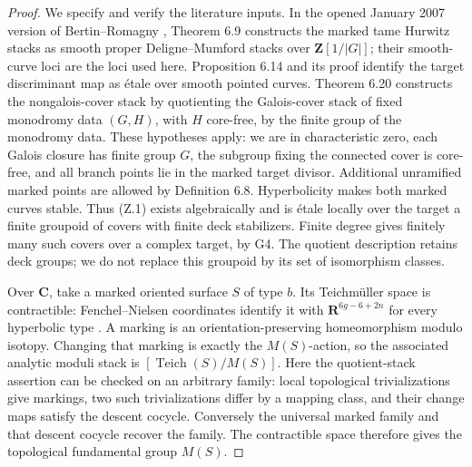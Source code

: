 \begin{proof}
We specify and verify the literature inputs. In the opened January
2007 version of Bertin--Romagny \cite{G_BertinRomagny2007}, Theorem 6.9
constructs the marked tame Hurwitz stacks as smooth proper
Deligne--Mumford stacks over $\mathbf Z[1/|G|]$; their smooth-curve
loci are the loci used here. Proposition 6.14 and its proof identify
the target discriminant map as \'etale over smooth pointed curves.
Theorem 6.20 constructs the nongalois-cover stack by quotienting the
Galois-cover stack of fixed monodromy data $(G,H)$, with $H$ core-free,
by the finite group of the monodromy data. These hypotheses apply:
we are in characteristic zero, each Galois closure has finite group
$G$, the subgroup fixing the connected cover is core-free, and all
branch points lie in the marked target divisor. Additional unramified
marked points are allowed by Definition 6.8. Hyperbolicity makes both
marked curves stable. Thus (Z.1) exists algebraically and is \'etale
locally over the target a finite groupoid of covers with finite deck
stabilizers. Finite degree gives finitely many such covers over a
complex target, by G4. The quotient description retains deck groups;
we do not replace this groupoid by its set of isomorphism classes.

Over $\mathbf C$, take a marked oriented surface $S$ of type $b$.
Its Teichm\"uller space is contractible: Fenchel--Nielsen coordinates
identify it with $\mathbf R^{6g-6+2n}$ for every hyperbolic type
\cite[Theorem 10.6 and section 10.6.3]{G_FarbMargalit}. A marking is
an orientation-preserving homeomorphism modulo isotopy. Changing that
marking is exactly the $M(S)$-action, so the associated analytic
moduli stack is $[\operatorname{Teich}(S)/M(S)]$.
Here the quotient-stack assertion can be checked on an arbitrary
family: local topological trivializations give markings, two such
trivializations differ by a mapping class, and their change maps
satisfy the descent cocycle. Conversely the universal marked family
and that descent cocycle recover the family. The contractible space
therefore gives the topological fundamental group $M(S)$.


\end{proof}
